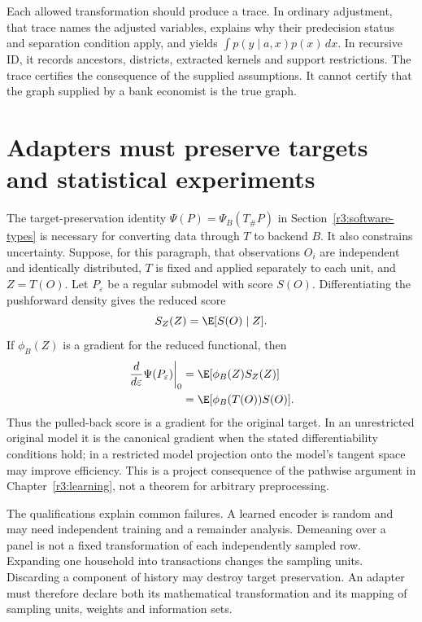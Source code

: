 Each allowed transformation should produce a trace. In ordinary adjustment,
that trace names the adjusted variables, explains why their predecision
status and separation condition apply, and yields
$\int p(y\mid a,x)p(x)\,dx$. In recursive ID, it records ancestors,
districts, extracted kernels and support restrictions. The trace certifies
the consequence of the supplied assumptions. It cannot certify that
the graph supplied by a bank economist is the true graph.

\section{Adapters must preserve targets and statistical experiments}
\label{r3:adapter-inference}

The target-preservation identity
$\Psi(P)=\Psi_B(T_\#P)$ in Section~\ref{r3:software-types} is necessary
for converting data through $T$ to backend $B$. It also constrains
uncertainty. Suppose, for this paragraph, that observations $O_i$ are
independent and identically distributed, $T$ is fixed and applied
separately to each unit, and $Z=T(O)$. Let $P_\varepsilon$ be a regular
submodel with score $S(O)$. Differentiating the pushforward density gives
the reduced score
\[
 S_Z(Z)=\E[S(O)\mid Z].
\]
If $\phi_B(Z)$ is a gradient for the reduced functional, then
\begin{align}
 \left.\frac{d}{d\varepsilon}\Psi(P_\varepsilon)\right|_0
 &=\E[\phi_B(Z)S_Z(Z)]\nonumber\\
 &=\E[\phi_B(T(O))S(O)].
 \label{r3:gradient-pullback}
\end{align}
Thus the pulled-back score is a gradient for the original target.
In an unrestricted original model it is the canonical gradient when
the stated differentiability conditions hold; in a restricted model
projection onto the model's tangent space may improve efficiency.
This is a project consequence of the pathwise argument in
Chapter~\ref{r3:learning}, not a theorem for arbitrary preprocessing.

The qualifications explain common failures. A learned encoder is random
and may need independent training and a remainder analysis. Demeaning
over a panel is not a fixed transformation of each independently sampled
row. Expanding one household into transactions changes the sampling
units. Discarding a component of history may destroy target preservation.
An adapter must therefore declare both its mathematical transformation
and its mapping of sampling units, weights and information sets.

